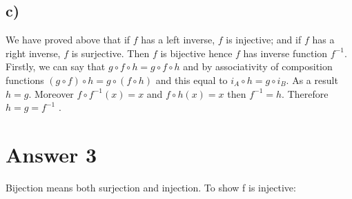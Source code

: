 \documentclass[12pt]{article}
\begin{document}
\subsection*{c)}
We have proved above that if $f$ has a left inverse, $f$ is injective; and if $f$ has a right inverse, $f$ is surjective. Then $f$ is bijective hence $f$ has inverse function $f^{-1}$. Firstly, we can say that $g \circ f \circ h = g \circ f \circ h$ and by associativity of composition functions $(g \circ f) \circ h = g \circ (f \circ h)$ and this equal to $i_A \circ h = g \circ i_B$. As a result $h = g$. Moreover $f \circ f^{-1}(x) = x$ and $f \circ h(x) = x$ then $f^{-1} = h$. Therefore $h = g = f^{-1}$ .
\section*{Answer 3}
Bijection means both surjection and injection. To show f is injective:
\end{document}
